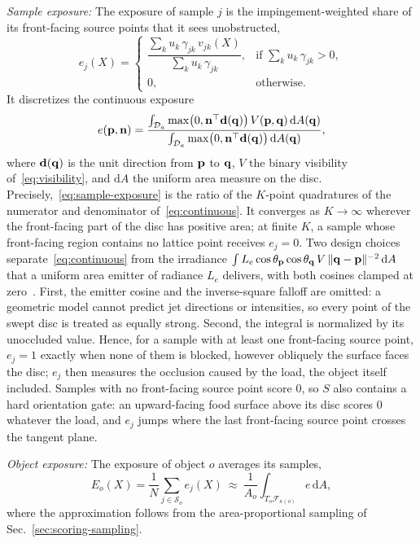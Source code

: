 \textit{Sample exposure:}
The exposure of sample $j$ is the impingement-weighted share of its front-facing source points that it sees unobstructed,
\begin{equation}
e_j(X)=
\begin{cases}
\dfrac{\sum_{k}u_k\,\gamma_{jk}\,v_{jk}(X)}{\sum_{k}u_k\,\gamma_{jk}}, & \text{if }\sum_{k}u_k\,\gamma_{jk}>0,\\[8pt]
0, & \text{otherwise.}
\end{cases}
\label{eq:sample-exposure}
\end{equation}
It discretizes the continuous exposure
\begin{equation}
e(\mathbf{p},\mathbf{n})=\frac{\int_{\mathcal{D}_a}\max\bigl(0,\mathbf{n}^\top\mathbf{d}(\mathbf{q})\bigr)\,V(\mathbf{p},\mathbf{q})\,\mathrm{d}A(\mathbf{q})}{\int_{\mathcal{D}_a}\max\bigl(0,\mathbf{n}^\top\mathbf{d}(\mathbf{q})\bigr)\,\mathrm{d}A(\mathbf{q})},
\label{eq:continuous}
\end{equation}
where $\mathbf{d}(\mathbf{q})$ is the unit direction from $\mathbf{p}$ to $\mathbf{q}$, $V$ the binary visibility of~\eqref{eq:visibility}, and $\mathrm{d}A$ the uniform area measure on the disc.
Precisely,~\eqref{eq:sample-exposure} is the ratio of the $K$-point quadratures of the numerator and denominator of~\eqref{eq:continuous}.
It converges as $K\to\infty$ wherever the front-facing part of the disc has positive area; at finite $K$, a sample whose front-facing region contains no lattice point receives $e_j=0$.
Two design choices separate~\eqref{eq:continuous} from the irradiance $\int L_e\cos\theta_{\mathbf{p}}\cos\theta_{\mathbf{q}}\,V\,\lVert\mathbf{q}-\mathbf{p}\rVert^{-2}\,\mathrm{d}A$ that a uniform area emitter of radiance $L_e$ delivers, with both cosines clamped at zero~\cite{pharr2016pbrt}.
First, the emitter cosine and the inverse-square falloff are omitted: a geometric model cannot predict jet directions or intensities, so every point of the swept disc is treated as equally strong.
Second, the integral is normalized by its unoccluded value.
Hence, for a sample with at least one front-facing source point, $e_j=1$ exactly when none of them is blocked, however obliquely the surface faces the disc; $e_j$ then measures the occlusion caused by the load, the object itself included.
Samples with no front-facing source point score $0$, so $S$ also contains a hard orientation gate: an upward-facing food surface above its disc scores $0$ whatever the load, and $e_j$ jumps where the last front-facing source point crosses the tangent plane.

\textit{Object exposure:}
The exposure of object $o$ averages its samples,
\begin{equation}
E_o(X)=\frac1N\sum_{j\in\mathcal{S}_o}e_j(X)\ \approx\ \frac{1}{A_o}\int_{T_o\mathcal{F}_{\kappa(o)}}e\,\mathrm{d}A,
\label{eq:object-exposure}
\end{equation}
where the approximation follows from the area-proportional sampling of Sec.~\ref{sec:scoring-sampling}.

